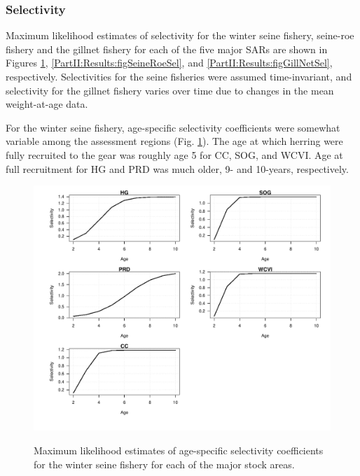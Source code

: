 \subsubsection{Selectivity}

Maximum likelihood estimates of selectivity for the winter seine fishery, seine-roe fishery and the gillnet fishery for each of the five major SARs are shown in Figures \ref{PartII:Results:figWinterSeineSel}, \ref{PartII:Results:figSeineRoeSel}, and \ref{PartII:Results:figGillNetSel}, respectively.  Selectivities for the seine fisheries were assumed time-invariant, and selectivity for the gillnet fishery varies over time due to changes in the mean weight-at-age data.

For the winter seine fishery, age-specific selectivity coefficients were somewhat variable among the assessment regions (Fig. \ref{PartII:Results:figWinterSeineSel}).  The age at which herring were fully recruited to the gear was roughly age 5 for CC, SOG, and WCVI.  Age at full recruitment for HG and PRD was much older, 9- and 10-years, respectively.


\begin{figure}[!tbp]
	\includegraphics[width=\textwidth]{../FIGS/qPriorFigs/iscam_fig_sel2d_winter_seine_sel.pdf}\\
	\caption{Maximum likelihood estimates of age-specific selectivity coefficients for the winter seine fishery for each of the major stock areas.}\label{PartII:Results:figWinterSeineSel}
\end{figure}

